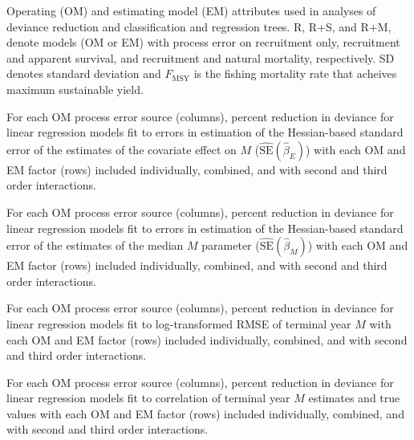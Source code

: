 \documentclass[
  12pt,
]{article}
\newcommand{\Fmsy}{\ensuremath{F_{\text{MSY}}}\xspace}
\begin{document}
\begin{table}
\caption{Operating (OM) and estimating model (EM) attributes used in analyses of deviance reduction and classification and regression trees. R, R+S, and R+M, denote models (OM or EM) with process error on recruitment only, recruitment and apparent survival, and recruitment and natural mortality, respectively. SD denotes standard deviation and \Fmsy is the fishing mortality rate that acheives maximum sustainable yield.}\label{factor_table}
{}
\end{table}
\pagebreak
\clearpage

\begin{table}
\caption{For each OM process error source (columns), percent reduction in deviance for linear regression models fit to errors in estimation of the Hessian-based standard error of the estimates of the covariate effect on $M$ ($\widehat {\text{SE}}\left(\widehat \beta_E\right)$) with each OM and EM factor (rows) included individually, combined, and with second and third order interactions.}\label{bias_ecov_beta_se_PRD_table}
{}
\end{table}
\pagebreak

\begin{table}
\caption{For each OM process error source (columns), percent reduction in deviance for linear regression models fit to errors in estimation of the Hessian-based standard error of the estimates of the median $M$ parameter ($\widehat {\text{SE}}\left(\widehat \beta_M\right)$) with each OM and EM factor (rows) included individually, combined, and with second and third order interactions.}\label{median_M_se_bias_PRD_table}
{}
\end{table}
\pagebreak

\begin{table}
\caption{For each OM process error source (columns), percent reduction in deviance for linear regression models fit to log-transformed RMSE of terminal year $M$ with each OM and EM factor (rows) included individually, combined, and with second and third order interactions.}\label{rmse_M_PRD_table}
{}
\end{table}
\pagebreak

\begin{table}
\caption{For each OM process error source (columns), percent reduction in deviance for linear regression models fit to correlation of terminal year $M$ estimates and true values with each OM and EM factor (rows) included individually, combined, and with second and third order interactions.}\label{corr_M_PRD_table}
{}
\end{table}
\pagebreak
\end{document}
